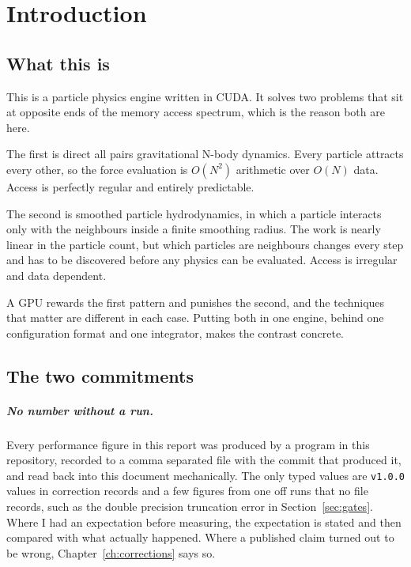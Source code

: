 \chapter{Introduction}

\section{What this is}

This is a particle physics engine written in CUDA. It solves two problems that
sit at opposite ends of the memory access spectrum, which is the reason both
are here.

The first is direct all pairs gravitational N-body dynamics. Every particle
attracts every other, so the force evaluation is $O(N^2)$ arithmetic over $O(N)$
data. Access is perfectly regular and entirely predictable.

The second is smoothed particle hydrodynamics, in which a particle interacts
only with the neighbours inside a finite smoothing radius. The work is nearly
linear in the particle count, but which particles are neighbours changes every
step and has to be discovered before any physics can be evaluated. Access is
irregular and data dependent.

A GPU rewards the first pattern and punishes the second, and the techniques
that matter are different in each case. Putting both in one engine, behind one
configuration format and one integrator, makes the contrast concrete.

\section{The two commitments}

\paragraph{No number without a run.} Every performance figure in this report
was produced by a program in this repository, recorded to a comma separated
file with the commit that produced it, and read back into this document
mechanically. The only typed values are \texttt{v1.0.0} values in correction records and
a few figures from one off runs that no file records, such as the double precision
truncation error in Section~\ref{sec:gates}. Where I had an expectation
before measuring, the expectation is stated and then compared with what
actually happened. Where a published claim turned out to be wrong,
Chapter~\ref{ch:corrections} says so.

